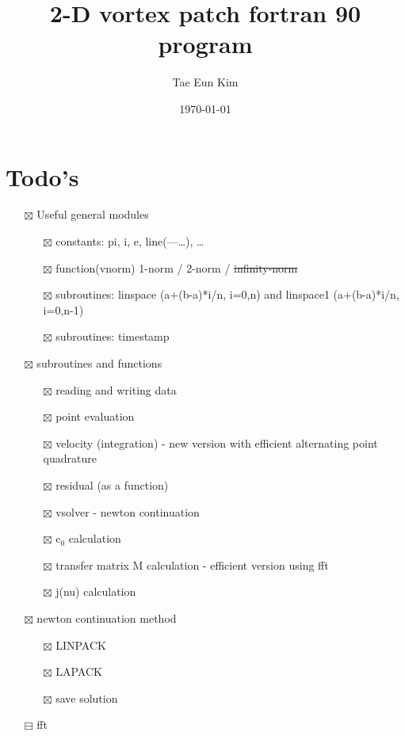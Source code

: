 \documentclass[11pt]{article}
\author{Tae Eun Kim}
\date{\today}
\title{2-D vortex patch fortran 90 program}
\begin{document}
\maketitle
\tableofcontents

\section{Todo's}
\label{sec:org5b38cc3}
\begin{itemize}
\item[{$\boxtimes$}] Useful general modules
\begin{itemize}
\item[{$\boxtimes$}] constants: pi, i, e, line(---\ldots{}), \ldots{}
\item[{$\boxtimes$}] function(vnorm) 1-norm / 2-norm / \sout{infinity-norm}
\item[{$\boxtimes$}] subroutines: linspace (a+(b-a)*i/n, i=0,n) and linspace1 (a+(b-a)*i/n, i=0,n-1)
\item[{$\boxtimes$}] subroutines: timestamp
\end{itemize}
\item[{$\boxtimes$}] subroutines and functions
\begin{itemize}
\item[{$\boxtimes$}] reading and writing data
\item[{$\boxtimes$}] point evaluation
\item[{$\boxtimes$}] velocity (integration) - new version with efficient alternating point quadrature
\item[{$\boxtimes$}] residual (as a function)
\item[{$\boxtimes$}] vsolver -  newton continuation
\item[{$\boxtimes$}] c\(_{\text{0}}\) calculation
\item[{$\boxtimes$}] transfer matrix M calculation - efficient version using fft
\item[{$\boxtimes$}] j(nu) calculation
\end{itemize}
\item[{$\boxtimes$}] newton continuation method
\begin{itemize}
\item[{$\boxtimes$}] LINPACK
\item[{$\boxtimes$}] LAPACK
\item[{$\boxtimes$}] save solution
\end{itemize}
\item[{$\boxminus$}] fft
\begin{itemize}

\end{itemize}
\end{itemize}
\end{document}
